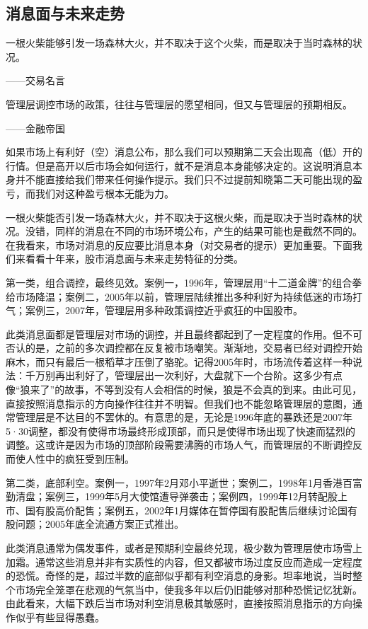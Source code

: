 \subsection{消息面与未来走势}

{\kaishu
一根火柴能够引发一场森林大火，并不取决于这个火柴，而是取决于当时森林的状况。

\hfill ——交易名言

管理层调控市场的政策，往往与管理层的愿望相同，但又与管理层的预期相反。

\hfill ——金融帝国
}

如果市场上有利好（空）消息公布，那么我们可以预期第二天会出现高（低）开的行情。但是高开以后市场会如何运行，就不是消息本身能够决定的。这说明消息本身并不能直接给我们带来任何操作提示。我们只不过提前知晓第二天可能出现的盈亏，而我们对这种盈亏根本无能为力。

一根火柴能否引发一场森林大火，并不取决于这根火柴，而是取决于当时森林的状况。没错，同样的消息在不同的市场环境公布，产生的结果可能也是截然不同的。在我看来，市场对消息的反应要比消息本身（对交易者的提示）更加重要。下面我们来看看十年来，股市消息面与未来走势特征的分类。

第一类，组合调控，最终见效。案例一，1996年，管理层用“十二道金牌”的组合拳给市场降温；案例二，2005年以前，管理层陆续推出多种利好为持续低迷的市场打气；案例三，2007年，管理层用多种政策调控近乎疯狂的中国股市。

此类消息面都是管理层对市场的调控，并且最终都起到了一定程度的作用。但不可否认的是，之前的多次调控都在反复被市场嘲笑。渐渐地，交易者已经对调控开始麻木，而只有最后一根稻草才压倒了骆驼。记得2005年时，市场流传着这样一种说法：千万别再出利好了，管理层出一次利好，大盘就下一个台阶。这多少有点像“狼来了”的故事，不等到没有人会相信的时候，狼是不会真的到来。由此可见，直接按照消息指示的方向操作往往并不明智。但我们也不能忽略管理层的意图，通常管理层是不达目的不罢休的。有意思的是，无论是1996年底的暴跌还是2007年5·30调整，都没有使得市场最终形成顶部，而只是使得市场出现了快速而猛烈的调整。这或许是因为市场的顶部阶段需要沸腾的市场人气，而管理层的不断调控反而使人性中的疯狂受到压制。

第二类，底部利空。案例一，1997年2月邓小平逝世；案例二，1998年1月香港百富勤清盘；案例三，1999年5月大使馆遭导弹袭击；案例四，1999年12月转配股上市、国有股高价配售；案例五，2002年1月媒体在暂停国有股配售后继续讨论国有股问题；2005年底全流通方案正式推出。

此类消息通常为偶发事件，或者是预期利空最终兑现，极少数为管理层使市场雪上加霜。通常这些消息并非有实质性的内容，但又都被市场过度反应而造成一定程度的恐慌。奇怪的是，超过半数的底部似乎都有利空消息的身影。坦率地说，当时整个市场完全笼罩在悲观的气氛当中，使我多年以后仍旧能够对那种恐慌记忆犹新。由此看来，大幅下跌后当市场对利空消息极其敏感时，直接按照消息指示的方向操作似乎有些显得愚蠢。

